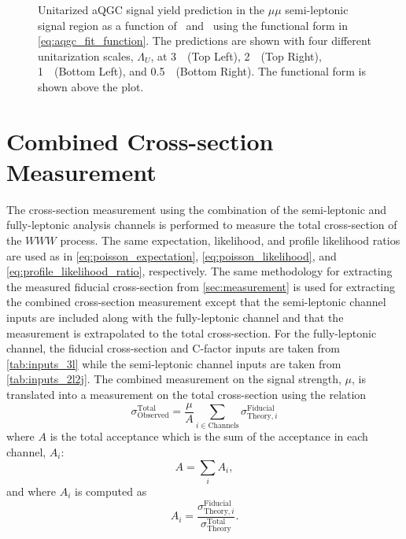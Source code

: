 \begin{figure}[tb]
\caption{Unitarized aQGC signal yield prediction in the $\mu\mu$ semi-leptonic 
signal region
as a function of \fszero~and \fsone~using the functional
form in \eqn\eqref{eq:aqgc_fit_function}. 
The predictions are shown with four different unitarization scales, $\Lambda_U$,
at 3~\TeV~(Top Left),
2~\TeV~(Top Right), 1~\TeV~(Bottom Left), and 0.5~\TeV~(Bottom Right).
The functional form is shown
above the plot.}
\label{fig:aqgc_fit_mumu_unit}
\end{figure}

\section{Combined Cross-section Measurement}
\label{sec:combined_measurement}

The cross-section measurement using the combination of the semi-leptonic
and fully-leptonic analysis channels is performed to 
measure the total cross-section of the $WWW$ process. 
The same expectation, likelihood, and profile likelihood
ratios are used as in \eqn\eqref{eq:poisson_expectation},
\eqn\eqref{eq:poisson_likelihood}, and
\eqn\eqref{eq:profile_likelihood_ratio}, respectively.
The same methodology for extracting the measured fiducial
cross-section from
\sec\ref{sec:measurement} is used for extracting the combined
cross-section measurement except that the semi-leptonic channel
inputs are included along with the fully-leptonic channel
and that the measurement is extrapolated to the total
cross-section.
For the fully-leptonic channel,
the fiducial cross-section and C-factor inputs 
are taken from \tab\ref{tab:inputs_3l}
while the semi-leptonic channel inputs are taken from 
\tab\ref{tab:inputs_2l2j}.
The combined measurement on the signal strength, $\mu$, is translated
into a measurement on the total cross-section using the relation
\begin{equation}
\sigma^{\textrm{Total}}_{\textrm{Observed}} = \frac{\mu}{A} \sum_{i\in \textrm{Channels}} \sigma^{\textrm{Fiducial}}_{\textrm{Theory},i}
\label{eq:sigmatot}
\end{equation}
where $A$ is the total acceptance which is the sum of the 
acceptance in each channel, $A_i$:
\begin{equation}
A = \sum_i A_i, 
\end{equation}
and where $A_i$ is computed as
\begin{equation}
A_i = \frac{ \sigma^{\textrm{Fiducial}}_{\textrm{Theory},i} }{ \sigma^{\textrm{Total}}_{\textrm{Theory}}}.
\end{equation}
